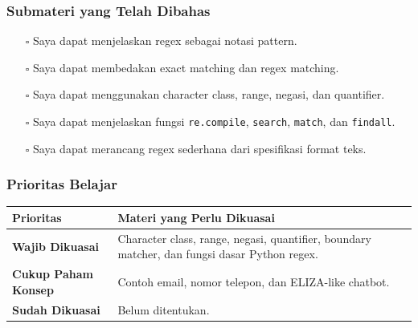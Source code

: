\subsubsection{Submateri yang Telah Dibahas}
\begin{itemize}
    \item[$\square$] Saya dapat menjelaskan regex sebagai notasi pattern.
    \item[$\square$] Saya dapat membedakan exact matching dan regex matching.
    \item[$\square$] Saya dapat menggunakan character class, range, negasi, dan quantifier.
    \item[$\square$] Saya dapat menjelaskan fungsi \texttt{re.compile}, \texttt{search}, \texttt{match}, dan \texttt{findall}.
    \item[$\square$] Saya dapat merancang regex sederhana dari spesifikasi format teks.
\end{itemize}

\subsubsection{Prioritas Belajar}
\begin{tabularx}{\textwidth}{|L{0.22\textwidth}|X|}
\hline
\textbf{Prioritas} & \textbf{Materi yang Perlu Dikuasai} \\
\hline
\textbf{Wajib Dikuasai} & Character class, range, negasi, quantifier, boundary matcher, dan fungsi dasar Python regex. \\
\hline
\textbf{Cukup Paham Konsep} & Contoh email, nomor telepon, dan ELIZA-like chatbot. \\
\hline
\textbf{Sudah Dikuasai} & Belum ditentukan. \\
\hline
\end{tabularx}
